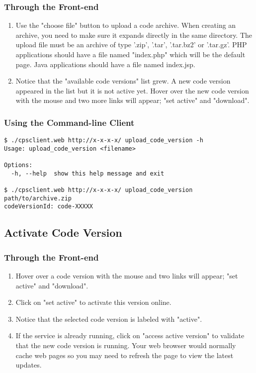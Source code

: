 \documentclass[12pt]{article}
\newenvironment{framedbox}[1]%
{\begin{framed}
 \begingroup
 \fontsize{#1}{#1}\selectfont
}
{
 \endgroup
 \end{framed}
}
\begin{document}
\subsubsection{Through the Front-end}
\begin{enumerate}
\item Use the "choose file" button to upload a code archive. When creating an
      archive, you need to make sure it expands directly in the same directory.
      The upload file must be an archive of type '.zip', '.tar', '.tar.bz2' or
      '.tar.gz'. PHP applications should have a file named "index.php"
      which will be the default page. Java applications should have a file
      named index.jsp.
\item Notice that the "available code versions" list grew. A new code version
      appeared in the list but it is not active yet. Hover over the new code
      version with the mouse and two more links will appear; "set active" and
      "download".
\end{enumerate}


\subsubsection{Using the Command-line Client}
\begin{framedbox}{8pt}\begin{verbatim}
$ ./cpsclient.web http://x-x-x-x/ upload_code_version -h
Usage: upload_code_version <filename>

Options:
  -h, --help  show this help message and exit

$ ./cpsclient.web http://x-x-x-x/ upload_code_version path/to/archive.zip
codeVersionId: code-XXXXX
\end{verbatim}\end{framedbox}

\subsection{Activate Code Version}
\subsubsection{Through the Front-end}
\begin{enumerate}
\item Hover over a code version with the mouse and two links will appear;
      "set active" and "download".
\item Click on "set active" to activate this version online.
\item Notice that the selected code version is labeled with "active".
\item If the service is already running, click on "access active version" to
      validate that the new code version is running. Your web browser would
      normally cache web pages so you may need to refresh the page to view
      the latest updates.
\end{enumerate}
\end{document}
